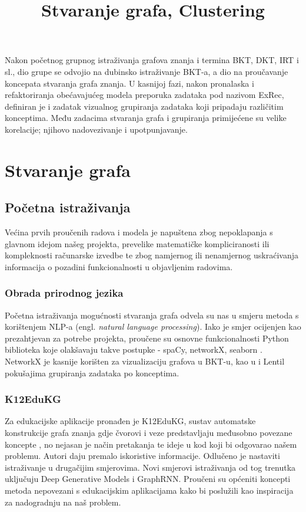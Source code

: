 \documentclass[times, utf8,projekt]{fer}
\begin{document}
\title{Stvaranje grafa, Clustering}
\maketitle
Nakon početnog grupnog istraživanja grafova znanja i termina BKT, DKT, IRT i sl., dio grupe se odvojio na dubinsko istraživanje BKT-a, a dio na proučavanje koncepata stvaranja grafa znanja. U kasnijoj fazi, nakon pronalaska i refaktoriranja obećavajućeg modela preporuka zadataka pod nazivom ExRec, definiran je i zadatak vizualnog grupiranja zadataka koji pripadaju različitim konceptima. Među zadacima stvaranja grafa i grupiranja primijećene su velike korelacije; njihovo nadovezivanje i upotpunjavanje.

\chapter{Stvaranje grafa}
\section{Početna istraživanja}
Većina prvih proučenih radova i modela je napuštena zbog nepoklapanja s glavnom idejom našeg projekta, prevelike matematičke kompliciranosti ili kompleknosti računarske izvedbe te zbog namjernog ili nenamjernog uskraćivanja informacija o pozadini funkcionalnosti u objavljenim radovima.\newline
\newline
\subsection{Obrada prirodnog jezika}
Početna istraživanja mogućnosti stvaranja grafa odvela su nas u smjeru metoda s korištenjem NLP-a (engl. \textit{natural language processing}). Iako je smjer ocijenjen kao prezahtjevan za potrebe projekta, proučene su osnovne funkcionalnosti Python biblioteka koje olakšavaju takve postupke - spaCy, networkX, seaborn \citep{ct1}. NetworkX je kasnije korišten za vizualizaciju grafova u BKT-u, kao u i Lentil pokušajima grupiranja zadataka po konceptima.\newline
\newline
\subsection{K12EduKG}
Za edukacijske aplikacije pronađen je K12EduKG, sustav automatske konstrukcije grafa znanja gdje čvorovi i veze predstavljaju međusobno povezane koncepte \citep{ct2}, no nejasan je način pretakanja te ideje u kod koji bi odgovarao našem problemu. Autori daju premalo iskoristive informacije. Odlučeno je nastaviti istraživanje u drugačijim smjerovima.\newline
\newline
Novi smjerovi istraživanja od tog trenutka uključuju Deep Generative Models i GraphRNN. Proučeni su općeniti koncepti metoda nepovezani s edukacijskim aplikacijama kako bi poslužili kao inspiracija za nadogradnju na naš problem.\newline
\newline
\end{document}
